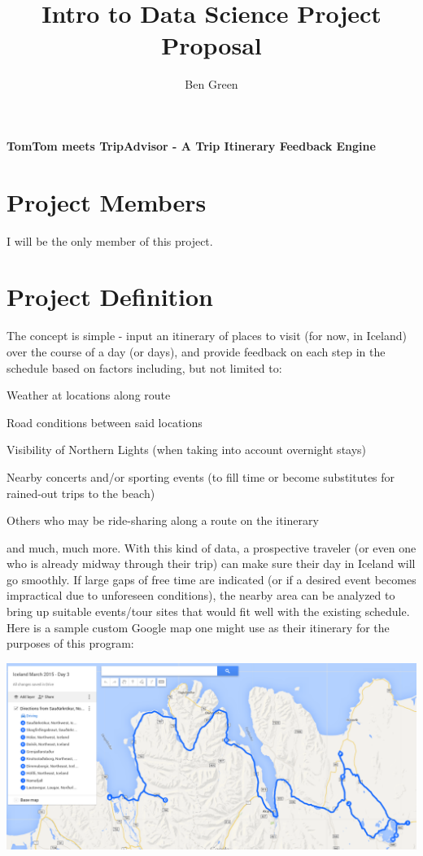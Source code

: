 \documentclass[9pt]{article}
\author{Ben Green}
\title{Intro to Data Science Project Proposal}
\begin{document}
\textbf{TomTom meets TripAdvisor - A Trip Itinerary Feedback Engine}

\section{Project Members}
I will be the only member of this project.

\section{Project Definition}
The concept is simple - input an itinerary of places to visit (for now, in Iceland) over the course of a day (or days), and provide feedback on each step in the schedule based on factors including, but not limited to:
	\begin{itemize}
	\item{Weather at locations along route}
	\item{Road conditions between said locations}
	\item{Visibility of Northern Lights (when taking into account overnight stays)}
	\item{Nearby concerts and/or sporting events (to fill time or become substitutes for rained-out trips to the beach)
	\item{Others who may be ride-sharing along a route on the itinerary}}
	\end{itemize}
and much, much more. With this kind of data, a prospective traveler (or even one who is already midway through their trip) can make sure their day in Iceland will go smoothly. If large gaps of free time are indicated (or if a desired event becomes impractical due to unforeseen conditions), the nearby area can be analyzed to bring up suitable events/tour sites that would fit well with the existing schedule.\\

Here is a sample custom Google map one might use as their itinerary for the purposes of this program:

\begin{center}
\includegraphics[keepaspectratio, scale=0.2]{map.png}
\end{center}
\end{document}
